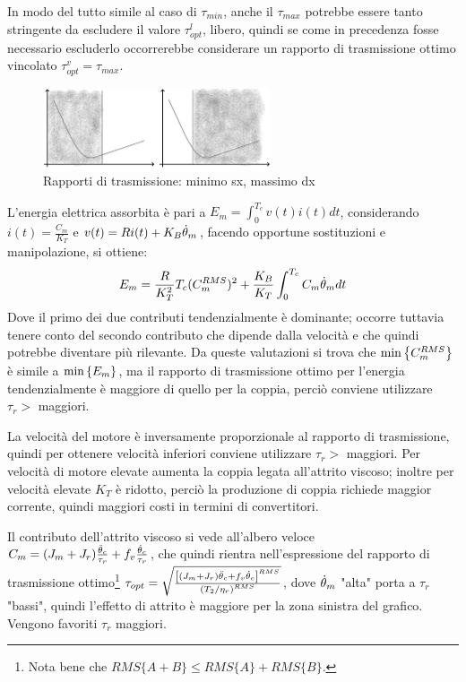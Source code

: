In modo del tutto simile al caso di \(\tau_{min}\), anche il \(\tau_{max}\) potrebbe essere tanto stringente da escludere il valore \(\tau_{opt}^l\), libero, quindi se come in precedenza fosse necessario escluderlo occorrerebbe considerare un rapporto di trasmissione ottimo vincolato \(\tau_{opt}^v=\tau_{max}\).

\begin{figure}[h]
    \centering
    \includegraphics[width=0.6\textwidth]{Immagini/tauRmax_tauRmin.png}
    \caption{Rapporti di trasmissione: minimo sx, massimo dx}
\end{figure}


L'energia elettrica assorbita è pari a \(E_m = \int^{T_c}_0 v(t) i(t) dt\),  considerando \(i(t)=\frac{C_m}{K_T}\) e \(v(t) = R i(t) + K_B \dot{\theta}_m\), facendo opportune sostituzioni e manipolazione, si ottiene:
\[ E_m = \frac{R}{K_T^2} T_c (C^{RMS}_m)^2 + \frac{K_B}{K_T} \int^{T_c}_0 C_m\dot{\theta}_m dt \]
Dove il primo dei due contributi tendenzialmente è dominante; occorre tuttavia tenere conto del secondo contributo che dipende dalla velocità e che quindi potrebbe diventare più rilevante.
Da queste valutazioni si trova che \(\operatorname{min}\left\{ C_m^{RMS} \right\}\) è simile a \(\operatorname{min}\left\{ E_m \right\}\), ma il rapporto di trasmissione ottimo per l'energia tendenzialmente è maggiore di quello per la coppia, perciò conviene utilizzare \(\tau_r >\) maggiori.

La velocità del motore è inversamente proporzionale al rapporto di trasmissione, quindi per ottenere velocità inferiori conviene utilizzare \(\tau_r >\) maggiori.
Per velocità di motore elevate aumenta la coppia legata all'attrito viscoso; inoltre per velocità elevate \(K_T\) è ridotto, perciò la produzione di coppia richiede maggior corrente, quindi maggiori costi in termini di convertitori.

Il contributo dell'attrito viscoso si vede all'albero veloce \(C_m = (J_m+J_r)\frac{\Ddot{\theta}_c}{\tau_r} + f_v \frac{\dot{\theta}_c}{\tau_r}\), che quindi rientra nell'espressione del rapporto di trasmissione ottimo\footnote{Nota bene che \(RMS\{A+B\}\leqslant RMS\{A\} +RMS\{B\}\).} \(\tau_{opt} = \sqrt{\frac{\left[(J_m + J_r)\Ddot{\theta}_c+f_v \dot{\theta}_c\right]^{RMS}}{\left(T_2/\eta_r\right)^{RMS}}}\), dove \(\dot{\theta}_m\) "alta" porta a \(\tau_r\) "bassi", quindi l'effetto di attrito è maggiore per la zona sinistra del grafico. Vengono favoriti \(\tau_r\) maggiori.

